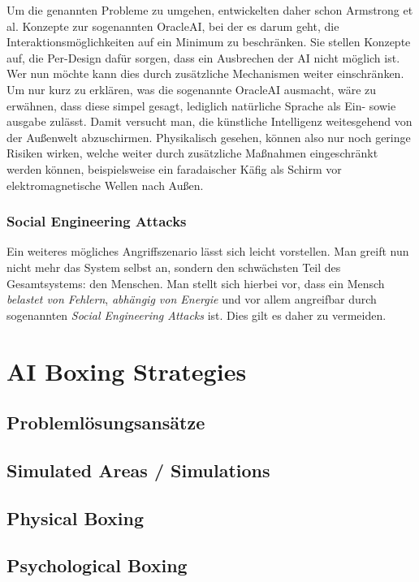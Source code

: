         Um die genannten Probleme zu umgehen, entwickelten daher schon Armstrong et al. Konzepte zur sogenannten OracleAI,
        bei der es darum geht, die Interaktionsmöglichkeiten auf ein Minimum zu beschränken.\cite{armstrongforthcoming}
        Sie stellen Konzepte auf, die Per-Design dafür sorgen, dass ein Ausbrechen der AI nicht möglich ist. Wer nun möchte
        kann dies durch zusätzliche Mechanismen weiter einschränken. Um nur kurz zu erklären, was die sogenannte OracleAI
        ausmacht, wäre zu erwähnen, dass diese simpel gesagt, lediglich natürliche Sprache als Ein- sowie ausgabe zulässt.
        Damit versucht man, die künstliche Intelligenz weitesgehend von der Außenwelt abzuschirmen. Physikalisch gesehen,
        können also nur noch geringe Risiken wirken, welche weiter durch zusätzliche Maßnahmen eingeschränkt werden können,
        beispielsweise ein faradaischer Käfig als Schirm vor elektromagnetische Wellen nach Außen.

    \subsubsection{Social Engineering Attacks}
        Ein weiteres mögliches Angriffszenario lässt sich leicht vorstellen. Man greift nun nicht mehr das System selbst
        an, sondern den schwächsten Teil des Gesamtsystems: den Menschen.\cite{armstrongforthcoming} \cite{yampolskiy2012leakproofing}
        Man stellt sich hierbei vor, dass ein Mensch \textit{belastet von Fehlern}, \textit{abhängig von Energie}
        und vor allem angreifbar durch sogenannten \textit{Social Engineering Attacks} ist. Dies gilt es daher zu
        vermeiden.

    \section{AI Boxing Strategies}
        \subsection{Problemlösungsansätze}
        \subsection{Simulated Areas / Simulations}
        \subsection{Physical Boxing}
        \subsection{Psychological Boxing}
